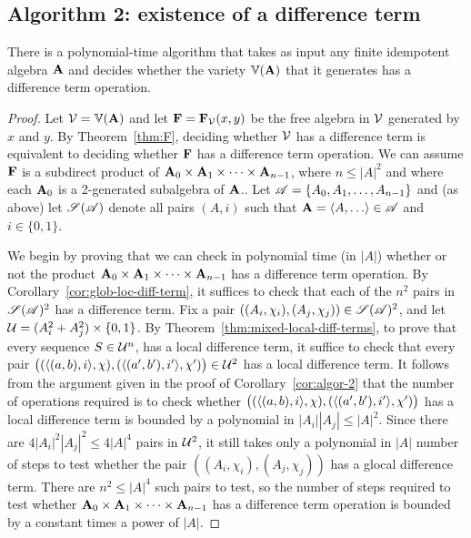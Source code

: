 \subsection*{Algorithm 2: existence of a difference term}
\begin{cor}
\label{cor:algor-2}
  There is a polynomial-time algorithm that takes as input
  any finite idempotent algebra $\mathbf{A}$ and decides whether
  the variety $\operatorname{\mathbb{V}}(\mathbf{A})$ that it generates
  has a difference term operation.
\end{cor}
\begin{proof}
  Let $\mathcal{V} = \operatorname{\mathbb{V}}(\mathbf{A})$ and let $\mathbf{F} = \mathbf{F}_{\mathcal{V}}(x,y)$ be the free algebra in
  $\mathcal{V}$ generated by $x$ and $y$.
  By Theorem~\ref{thm:F}, deciding whether $\mathcal{V}$ has a difference term is equivalent to 
  deciding whether $\mathbf{F}$ has a difference term operation.
  We can assume $\mathbf{F}$ is a subdirect product of
  $\mathbf{A}_0 \times \mathbf{A}_1 \times \cdots \times \mathbf{A}_{n-1}$, where $n\leq |A|^2$ and
  where each $\mathbf{A}_0$ is a 2-generated subalgebra of $\mathbf{A}$..
  Let $\mathscr{A} = \{A_0, A_1, \dots, A_{n-1}\}$ and (as above) let $\mathscr{S}(\mathscr{A})$ denote 
  all pairs $(A, i)$ such that $\bA = \<A, \dots\> \in \scA$ and $i\in \{0,1\}$.

  We begin by proving that we can check in polynomial time (in $|A|$)
  whether or not the product
  $\mathbf{A}_0 \times \mathbf{A}_1 \times \cdots \times \mathbf{A}_{n-1}$ has a difference term operation.
  By Corollary~\ref{cor:glob-loc-diff-term}, it suffices to check that each of the
  $n^2$ pairs  in 
  $\mathscr{S}(\mathscr{A})^2$ has a \glocal
  difference term.  Fix a pair
  $((A_i, \chi_i), (A_j, \chi_j)) \in  \mathscr{S}(\mathscr{A})^2$,
  and let $\mathcal{U}  = (A_i^2 + A_j^2)\times \{0,1\}$.
  By Theorem~\ref{thm:mixed-local-diff-terms},
  to prove that every sequence $S \in \mathcal{U}^n$,
  has a local difference term, it suffice to check that every pair
  $\bigl( (\langle(a, b), i\rangle, \chi), (\langle(a', b'), i'\rangle, \chi')\bigr) \in \mathcal{U}^2$
  has a local difference term. It follows from the argument given 
  in the proof of Corollary~\ref{cor:algor-2} that the number of 
  operations required is to check whether
  $\bigl( (\langle(a, b), i\rangle, \chi), (\langle(a', b'), i'\rangle, \chi')\bigr)$
  has a local difference term is bounded by a
  polynomial in $|A_i||A_j|\leq |A|^2$.  Since there are 
  $4|A_i|^2|A_j|^2 \leq 4|A|^4$ pairs in $\mathcal{U}^2$, 
  it still takes only a polynomial in $|A|$ number of steps to test whether
  the pair $((A_i, \chi_i), (A_j, \chi_j))$ has a glocal difference term.
  There are $n^2 \leq |A|^4$ such pairs to test, so the number of steps required to 
  test whether
  $\mathbf{A}_0 \times \mathbf{A}_1 \times \cdots \times \mathbf{A}_{n-1}$ has a difference term
  operation is bounded by a constant times a power of $|A|$.
\end{proof}

